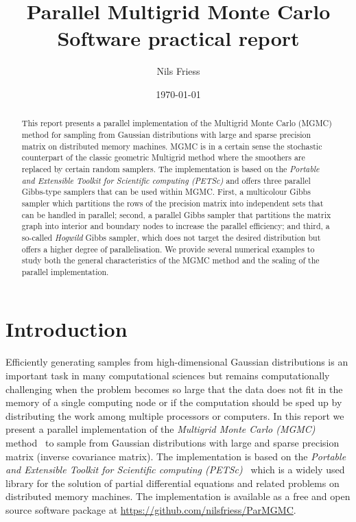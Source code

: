 \documentclass[
fontsize=11pt,
paper=a4,
numbers=noenddot
]{scrartcl}
\title{Parallel Multigrid Monte Carlo\\
{\normalsize Software practical report}}
\date{\today}
\author{Nils Friess}
\begin{document}
 
\maketitle

\begin{abstract}
    This report presents a parallel implementation of the Multigrid Monte Carlo (MGMC) method for sampling from Gaussian distributions with large and sparse precision matrix on distributed memory machines. MGMC is in a certain sense the stochastic counterpart of the classic geometric Multigrid method where the smoothers are replaced by certain random samplers. The implementation is based on the \emph{Portable and Extensible Toolkit for Scientific computing (PETSc)} and offers three parallel Gibbs-type samplers that can be used within MGMC. First, a multicolour Gibbs sampler which partitions the rows of the precision matrix into independent sets that can be handled in parallel; second, a parallel Gibbs sampler that partitions the matrix graph into interior and boundary nodes to increase the parallel efficiency; and third, a so-called \emph{Hogwild} Gibbs sampler, which does not target the desired distribution but offers a higher degree of parallelisation. We provide several numerical examples to study both the general characteristics of the MGMC method and the scaling of the parallel implementation.
\end{abstract}

\section{Introduction}
Efficiently generating samples from high-dimensional Gaussian distributions is an important task in many computational sciences but remains computationally challenging when the problem becomes so large that the data does not fit in the memory of a single computing node or if the computation should be sped up by distributing the work among multiple processors or computers. In this report we present a parallel implementation of the \emph{Multigrid Monte Carlo (MGMC)} method~\cite{goodmansokal} to sample from Gaussian distributions with large and sparse precision matrix (inverse covariance matrix). The implementation is based on the \emph{Portable and Extensible  Toolkit for Scientific computing (PETSc)}~\cite{petsc-web-page,petsc-user-ref} which is a widely used library for the solution of partial differential equations and related problems on distributed memory machines. The implementation is available as a free and open source software package at \url{https://github.com/nilsfriess/ParMGMC}.
\end{document}
